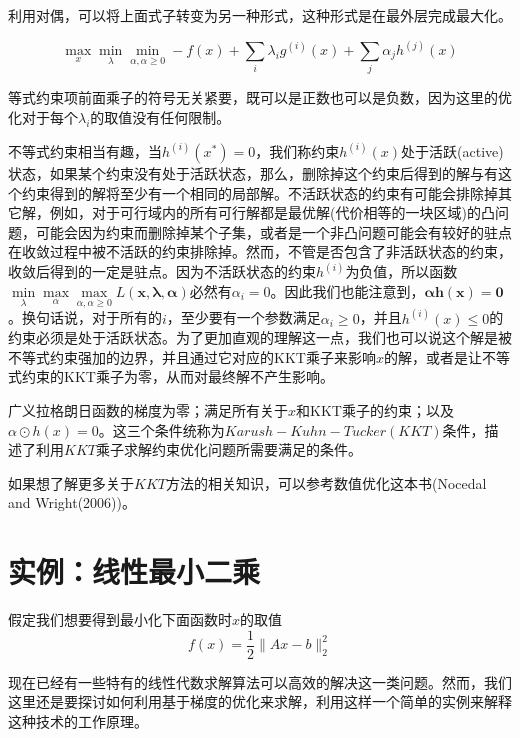 利用对偶，可以将上面式子转变为另一种形式，这种形式是在最外层完成最大化。

\begin{equation}
\max\limits_{x} \min\limits_{\lambda} \min\limits_{\alpha,\alpha \geq 0} -f(x)+\sum_{i}\lambda_i g^{(i)}(x) + \sum_{j}\alpha_j h^{(j)}(x)
\end{equation}

等式约束项前面乘子的符号无关紧要，既可以是正数也可以是负数，因为这里的优化对于每个$\lambda_i$的取值没有任何限制。

不等式约束相当有趣，当$h^{(i)}(x^*) = 0$，我们称约束$h^{(i)}(x)$处于活跃(active)状态，如果某个约束没有处于活跃状态，那么，删除掉这个约束后得到的解与有这个约束得到的解将至少有一个相同的局部解。不活跃状态的约束有可能会排除掉其它解，例如，对于可行域内的所有可行解都是最优解(代价相等的一块区域)的凸问题，可能会因为约束而删除掉某个子集，或者是一个非凸问题可能会有较好的驻点在收敛过程中被不活跃的约束排除掉。然而，不管是否包含了非活跃状态的约束，收敛后得到的一定是驻点。因为不活跃状态的约束$h^{(i)}$为负值，所以函数$\min\limits_\lambda \max\limits_\alpha \max\limits_{\alpha, \alpha \geq 0}L( \bm {x, \lambda, \alpha} )$必然有$\alpha_i = 0$。因此我们也能注意到，$\bm{ \alpha h(x) = 0 }$。换句话说，对于所有的$i$，至少要有一个参数满足$\alpha_i \geq 0$，并且$h^{(i)}(x) \le 0$的约束必须是处于活跃状态。为了更加直观的理解这一点，我们也可以说这个解是被不等式约束强加的边界，并且通过它对应的KKT乘子来影响$x$的解，或者是让不等式约束的KKT乘子为零，从而对最终解不产生影响。

广义拉格朗日函数的梯度为零；满足所有关于$x$和KKT乘子的约束；以及$\alpha \odot h(x) = 0$。这三个条件统称为$Karush-Kuhn-Tucker(KKT)$条件，描述了利用$KKT$乘子求解约束优化问题所需要满足的条件。

如果想了解更多关于$KKT$方法的相关知识，可以参考数值优化这本书(Nocedal and Wright(2006))。

\section{实例：线性最小二乘}
\label{sec:4.5}

假定我们想要得到最小化下面函数时$x$的取值
\begin{equation}
	f(x)=\frac{1}{2} \parallel Ax-b \parallel_{2}^{2}
\end{equation}

现在已经有一些特有的线性代数求解算法可以高效的解决这一类问题。然而，我们这里还是要探讨如何利用基于梯度的优化来求解，利用这样一个简单的实例来解释这种技术的工作原理。

